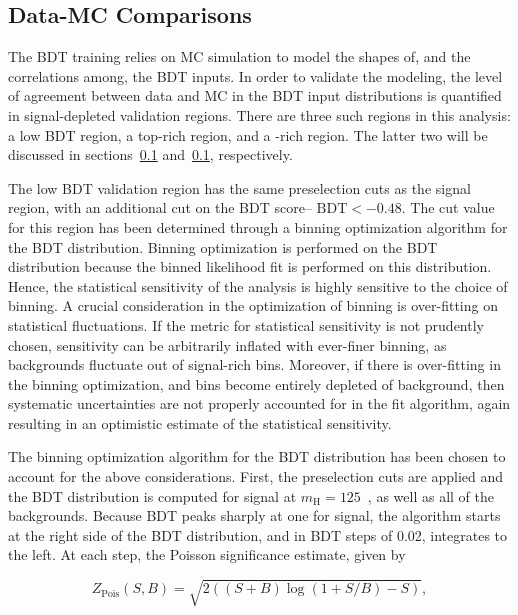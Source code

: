 \subsection{Data-MC Comparisons}

The BDT training relies on MC simulation to model the shapes of, and
the correlations among, the BDT inputs. In order to validate the
modeling, the level of agreement between data and MC in the BDT input
distributions is quantified in signal-depleted validation
regions. There are three such regions in this analysis: a low BDT
region, a top-rich region, and a \ZDY-rich region. The latter two will
be discussed in sections~\ref{} and~\ref{}, respectively. 

The low BDT validation region has the same preselection cuts as the signal
region, with an additional cut on the BDT score-- $\textrm{BDT} < -0.48$. The cut
value for this region has been determined through a binning optimization
algorithm for the BDT distribution. Binning optimization is performed
on the BDT distribution because the binned likelihood fit is performed
on this distribution. Hence, the statistical sensitivity of the analysis is highly
sensitive to the choice of binning. A crucial consideration in the
optimization of binning is over-fitting on statistical
fluctuations. If the metric for statistical sensitivity is not
prudently chosen, sensitivity can be arbitrarily inflated
with ever-finer binning, as backgrounds fluctuate out of signal-rich
bins. Moreover, if there is over-fitting in the binning optimization,
and bins become entirely depleted of background, then systematic
uncertainties are not properly accounted for in the fit algorithm,
again resulting in an optimistic estimate of the statistical
sensitivity. 

The binning optimization algorithm for the BDT distribution has been
chosen to account for the above considerations. First, the
preselection cuts are applied and the BDT distribution is computed for
signal at $m_{\textrm{H}} = 125$~\gev, as well as all of the
backgrounds. Because BDT peaks sharply at one for signal, the
algorithm starts at the right side of the BDT distribution, and in
BDT steps of 0.02, integrates to the left. At each step, the Poisson
significance estimate, given by

\begin{equation}
\label{chap:analysis:equation:pois_sig}
Z_{\textrm{Pois}}(S,B) = \sqrt{2((S+B)\log{(1+S/B)}-S)},
\end{equation}

